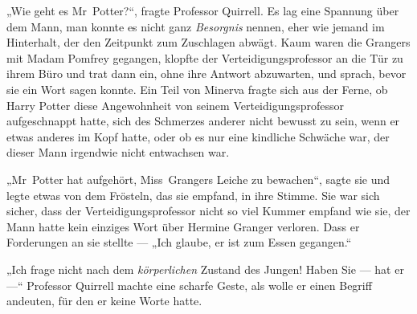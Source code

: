 „Wie geht es Mr~Potter?“, fragte Professor Quirrell. Es lag eine Spannung über dem Mann, man konnte es nicht ganz \emph{Besorgnis} nennen, eher wie jemand im Hinterhalt, der den Zeitpunkt zum Zuschlagen abwägt. Kaum waren die Grangers mit Madam Pomfrey gegangen, klopfte der Verteidigungsprofessor an die Tür zu ihrem Büro und trat dann ein, ohne ihre Antwort abzuwarten, und sprach, bevor sie ein Wort sagen konnte. Ein Teil von Minerva fragte sich aus der Ferne, ob Harry Potter diese Angewohnheit von seinem Verteidigungsprofessor aufgeschnappt hatte, sich des Schmerzes anderer nicht bewusst zu sein, wenn er etwas anderes im Kopf hatte, oder ob es nur eine kindliche Schwäche war, der dieser Mann irgendwie nicht entwachsen war.

„Mr~Potter hat aufgehört, Miss~Grangers Leiche zu bewachen“, sagte sie und legte etwas von dem Frösteln, das sie empfand, in ihre Stimme. Sie war sich sicher, dass der Verteidigungsprofessor nicht so viel Kummer empfand wie sie, der Mann hatte kein einziges Wort über Hermine Granger verloren. Dass er Forderungen an sie stellte —
„Ich glaube, er ist zum Essen gegangen.“

„Ich frage nicht nach dem \emph{körperlichen} Zustand des Jungen! Haben Sie — hat er —“ Professor Quirrell machte eine scharfe Geste, als wolle er einen Begriff andeuten, für den er keine Worte hatte.

